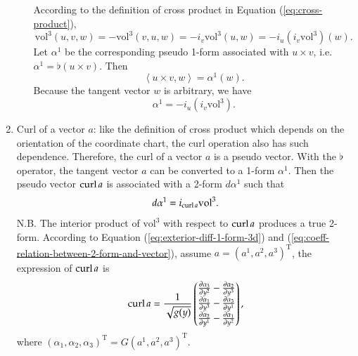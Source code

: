 \documentclass[11pt, a4paper]{book}
\begin{document}
\begin{enumerate}
\begin{itemize}
    \begin{Proof}
      According to the definition of cross product in Equation (\ref{eq:cross-product}),
      \begin{equation*}
        \mathrm{vol}^3(u,v,w) = -\mathrm{vol}^3(v,u,w) = -i_v \mathrm{vol}^3(u,w) =
        -i_u(i_v \mathrm{vol}^3)(w).
      \end{equation*}
      Let $\alpha^1$ be the corresponding pseudo 1-form associated with $u\times v$, i.e.
      $\alpha^1 = \flat(u\times v)$. Then
      \begin{equation*}
        \left\langle u\times v, w \right\rangle = \alpha^1(w).
      \end{equation*}
      Because the tangent vector $w$ is arbitrary, we have
      \begin{equation*}
        \alpha^1 = -i_u(i_v \mathrm{vol}^3).
      \end{equation*}
    \end{Proof}
  \end{itemize}
\item Curl of a vector $a$: like the definition of cross product which depends on the
  orientation of the coordinate chart, the curl operation also has such dependence.
  Therefore, the curl of a vector $a$ is a pseudo vector. With the $\flat$ operator, the
  tangent vector $a$ can be converted to a 1-form $\alpha^1$. Then the pseudo vector
  $\operatorname{curl} a$ is associated with a 2-form $d\alpha^1$ such that
  \begin{equation}
    d\alpha^1 = i_{\operatorname{curl} a} \mathrm{vol}^3.
  \end{equation}
  N.B. The interior product of $\mathrm{vol}^3$ with respect to $\operatorname{curl} a$ produces a true
  2-form. According to Equation (\ref{eq:exterior-diff-1-form-3d}) and
  (\ref{eq:coeff-relation-between-2-form-and-vector}), assume
  $a = (a^1,a^2,a^3)^{\mathrm{T}}$, the expression of $\operatorname{curl} a$ is
  \begin{equation}
    \label{eq:curl-expr-general}
    \operatorname{curl} a = \frac{1}{\sqrt{g(y)}} \begin{pmatrix}
      \frac{\partial \alpha_3}{\partial y^2} - \frac{\partial \alpha_2}{\partial y^3} \\
      \frac{\partial \alpha_1}{\partial y^3} - \frac{\partial \alpha_3}{\partial y^1} \\
      \frac{\partial \alpha_2}{\partial y^1} - \frac{\partial \alpha_1}{\partial y^2}
    \end{pmatrix},
  \end{equation}
  where $(\alpha_1,\alpha_2,\alpha_3)^{\mathrm{T}} = G (a^1,a^2,a^3)^{\mathrm{T}}$.


\end{enumerate}
\end{document}
